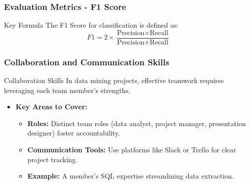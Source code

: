 \documentclass[aspectratio=169]{beamer}
\begin{document}
\begin{frame}[fragile]
    \frametitle{Evaluation Metrics - F1 Score}
    \begin{block}{Key Formula}
        The F1 Score for classification is defined as:
        \begin{equation}
            F1 = 2 \times \frac{\text{Precision} \times \text{Recall}}{\text{Precision} + \text{Recall}}
        \end{equation}
    \end{block}
\end{frame}

\begin{frame}[fragile]
    \frametitle{Collaboration and Communication Skills}
    \begin{block}{Collaboration Skills}
        In data mining projects, effective teamwork requires leveraging each team member's strengths.
    \end{block}
    
    \begin{itemize}
        \item \textbf{Key Areas to Cover:}
        \begin{itemize}
            \item \textbf{Roles:} Distinct team roles (data analyst, project manager, presentation designer) foster accountability.
            \item \textbf{Communication Tools:} Use platforms like Slack or Trello for clear project tracking.
            \item \textbf{Example:} A member's SQL expertise streamlining data extraction.
        \end{itemize}
    \end{itemize}
\end{frame}
\end{document}
